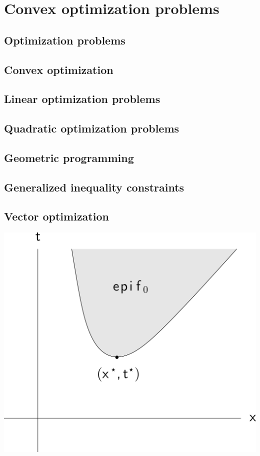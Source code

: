 \chapter{Convex optimization problems}

\clearpage
\section{Optimization problems}

\clearpage
\section{Convex optimization}

\clearpage
\section{Linear optimization problems}

\clearpage
\section{Quadratic optimization problems}

\clearpage
\section{Geometric programming}

\clearpage
\section{Generalized inequality constraints}

\clearpage
\section{Vector optimization}


\clearpage
\hfil\includegraphics[width=.5\textwidth]{../Graphics/135.png}\hfil

